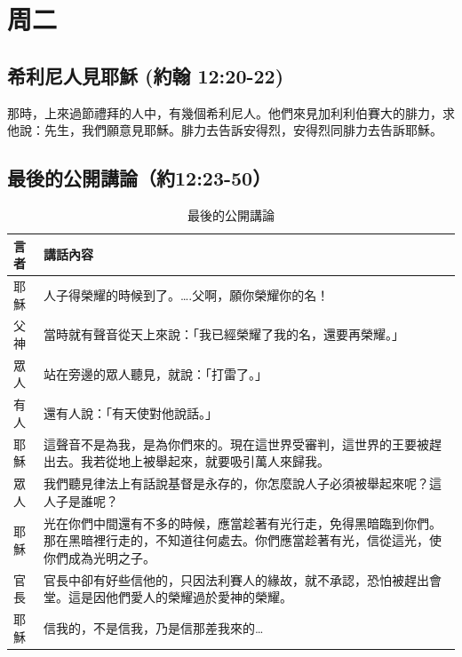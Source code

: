 

\section{周二}
\subsection{希利尼人見耶穌 (約翰 12:20-22)}

那時，上來過節禮拜的人中，有幾個希利尼人。他們來見加利利伯賽大的腓力，求他說：先生，我們願意見耶穌。腓力去告訴安得烈，安得烈同腓力去告訴耶穌。
\subsection{最後的公開講論（約12:23-50）}

\begin{table}[htbp]
  \centering
    \begin{tabular}{|p{3em}|p{38.645em}|}
    \toprule
    言者    & 講話內容 \\
    \midrule
    耶穌    & 人子得榮耀的時候到了。….父啊，願你榮耀你的名！ \\
    \midrule
    父神    & 當時就有聲音從天上來說：「我已經榮耀了我的名，還要再榮耀。」 \\
    \midrule
    眾人    & 站在旁邊的眾人聽見，就說：「打雷了。」 \\
    \midrule
    有人    & 還有人說：「有天使對他說話。」 \\
    \midrule
    耶穌    & 這聲音不是為我，是為你們來的。現在這世界受審判，這世界的王要被趕出去。我若從地上被舉起來，就要吸引萬人來歸我。 \\
    \midrule
    眾人    & 我們聽見律法上有話說基督是永存的，你怎麼說人子必須被舉起來呢？這人子是誰呢？ \\
    \midrule
    耶穌    & 光在你們中間還有不多的時候，應當趁著有光行走，免得黑暗臨到你們。那在黑暗裡行走的，不知道往何處去。你們應當趁著有光，信從這光，使你們成為光明之子。 \\
    \midrule
    官長    & 官長中卻有好些信他的，只因法利賽人的緣故，就不承認，恐怕被趕出會堂。這是因他們愛人的榮耀過於愛神的榮耀。 \\
    \midrule
    耶穌    & 信我的，不是信我，乃是信那差我來的… \\
    \bottomrule
    \end{tabular}%
    \caption{最後的公開講論}
  \label{tab:addlabel}%
\end{table}


